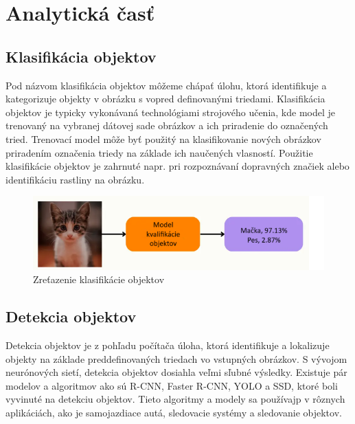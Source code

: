
\chapter{Analytická časť}\label{ch:current-state}

\section{Klasifikácia objektov}

Pod názvom klasifikácia objektov môžeme chápať úlohu, ktorá identifikuje a kategorizuje objekty v obrázku s vopred definovanými triedami.
Klasifikácia objektov je typicky vykonávaná technológiami strojového učenia, kde model je trenovaný na vybranej dátovej sade obrázkov a ich priradenie do označených tried.
Trenovací model môže byť použitý na klasifikovanie nových obrázkov priradením označenia triedy na základe ich naučených vlasností.
Použitie klasifikácie objektov je zahrnuté napr. pri rozpoznávaní dopravných značiek alebo identifikáciu rastliny na obrázku. \cite{kili}

\begin{figure}[H]
    \centering
    \includegraphics[width=1\linewidth]{figures/OCmodel.png}
    \caption{Zreťazenie klasifikácie objektov \label{OCmodel}}
    \label{fig:enter-label}
\end{figure}

\section{Detekcia objektov}

Detekcia objektov je z pohľadu počítača úloha, ktorá identifikuje a lokalizuje objekty na základe preddefinovaných triedach vo vstupných obrázkov.
S vývojom neurónových sietí, detekcia objektov dosiahla veľmi sľubné výsledky.
Existuje pár modelov a algoritmov ako sú R-CNN, Faster R-CNN, YOLO a SSD, ktoré boli vyvinuté na detekciu objektov.
Tieto algoritmy a modely sa používajp v rôznych aplikáciách, ako je samojazdiace autá, sledovacie systémy a sledovanie objektov.

